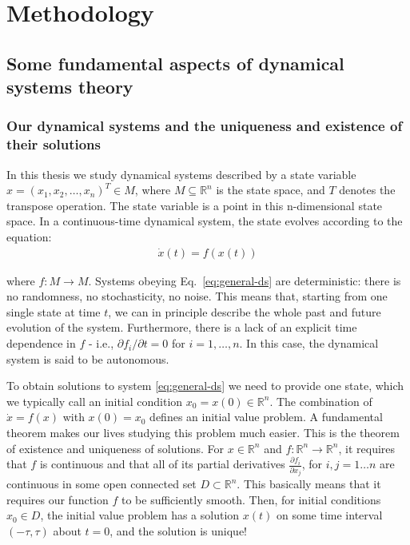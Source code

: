 \chapter{Methodology}\label{chap:methodology}

\section{Some fundamental aspects of dynamical systems theory}

\subsection{Our dynamical systems and the uniqueness and existence of their solutions}
In this thesis we study dynamical systems described by a state variable $x = (x_1, x_2, \ldots, x_n)^T \in M $, where $M \subseteq \mathbb{R}^n$ is the state space, and $T$ denotes the transpose operation. The state variable is a point in this n-dimensional state space. In a continuous-time dynamical system, the state evolves according to the equation:
%
\begin{align}
    \dot{x}(t) = f(x(t))
    \label{eq:general-ds}
\end{align}

where $f:M\to M$. Systems obeying Eq.~\ref{eq:general-ds} are deterministic: there is no randomness, no stochasticity, no noise. This means that, starting from one single state at time $t$, we can in principle describe the whole past and future evolution of the system. Furthermore, there is a lack of an explicit time dependence in $f$ - i.e., ${\partial f_i}/{\partial t} = 0$ for $i=1, \ldots, n$. In this case, the dynamical system is said to be autonomous. 

To obtain solutions to system \ref{eq:general-ds} we need to provide one state, which we typically call an initial condition $x_0 = x(0) \in \mathbb{R}^n$. The combination of $\dot{x} = f(x)$ with $x(0) = x_0$ defines an initial value problem. A fundamental theorem makes our lives studying this problem much easier. This is the theorem of existence and uniqueness of solutions. For $x \in \mathbb{R}^n$ and $f:\mathbb{R}^n\to\mathbb{R}^n$, it requires that $f$ is continuous and that all of its partial derivatives $\frac{\partial f_i}{\partial x_j}$, for $i, j = 1\ldots n$ are continuous in some open connected set $D \subset \mathbb{R}^n$. This basically means that it requires our function $f$ to be sufficiently smooth. Then, for initial conditions $x_0 \in D$, the initial value problem has a solution $x(t)$ on some time interval $(-\tau, \tau)$ about $t=0$, and the solution is unique! \cite{strogatz2002nonlinear} 

